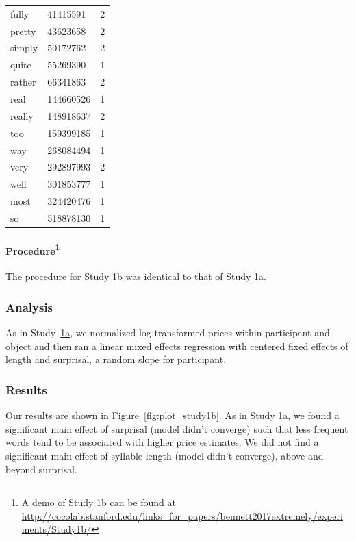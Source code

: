 \documentclass[10pt,letterpaper]{article}
\newcommand{\todo}[1]{{\color{red}#1}}
\begin{document}
\begin{table}[ht]
\begin{center}
\begin{tabular}{llc}
    fully & 41415591 & 2 \\ 
    pretty & 43623658 & 2 \\ 
    simply & 50172762 & 2 \\ 
    quite & 55269390 & 1 \\ 
    rather & 66341863 & 2 \\ 
    real & 144660526 & 1 \\ 
    really & 148918637 & 2 \\ 
    too & 159399185 & 1 \\ 
    way & 268084494 & 1 \\ 
    very & 292897993 & 2 \\ 
    well & 301853777 & 1 \\ 
    most & 324420476 & 1 \\ 
    so & 518878130 & 1
  \end{tabular}
 \end{center}
\end{table}

\paragraph{Procedure\footnote{A demo of Study \hyperref[sec:study1b]{1b} can be found at \url{http://cocolab.stanford.edu/links_for_papers/bennett2017extremely/experiments/Study1b/}}}

The procedure for Study \hyperref[sec:study1b]{1b} was identical to that of Study \hyperref[sec:study1a]{1a}.


\subsubsection{Analysis}

As in Study~\hyperref[sec:study1a]{1a}, we normalized log-transformed prices within participant and object and then ran a linear mixed effects regression with centered fixed effects of length and surprisal, a random slope for participant.

\subsubsection{Results}

Our results are shown in Figure~\ref{fig:plot_study1b}. 
As in Study 1a, we found a significant main effect of surprisal (\todo{model didn't converge}) such that less frequent words tend to be associated with higher price estimates.
We did not find a significant main effect of syllable length (\todo{model didn't converge}), above and beyond surprisal.
\end{document}
